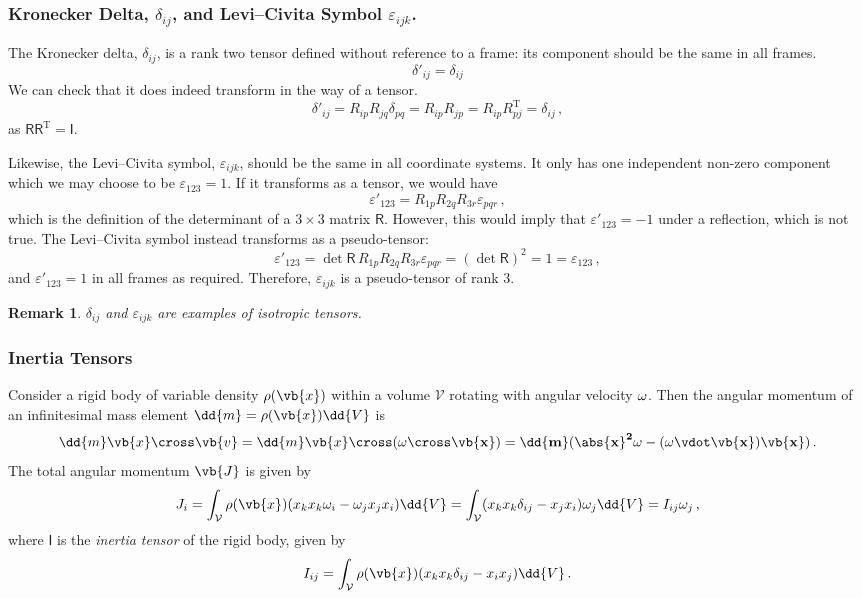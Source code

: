 \documentclass{article}
\theoremstyle{plain}\theoremheaderfont{\normalfont\itshape}\theorembodyfont{\rmfamily}\theoremseparator{.}\newtheorem*{rem}{Remark}\newtheorem*{ex}{Example}\newtheorem*{proof}{Proof}\newtheorem*{altp}{Alternative proof}
\theoremstyle{plain}\theoremheaderfont{\normalfont\bfseries}\theorembodyfont{\rmfamily}\theoremseparator{.}\newtheorem{thm}{Theorem}[section]\newtheorem{lem}[thm]{Lemma}\newtheorem{prop}[thm]{Proposition}\newtheorem*{cor}{Corollary}\newtheorem{defn}[thm]{Definition}\newtheorem{clm}[thm]{Claim}\newtheorem{clminproof}{Claim}
\theoremstyle{break}\theoremheaderfont{\normalfont\itshape}\theorembodyfont{\rmfamily}\theoremseparator{.\medskip}\newtheorem*{proofskip}{Proof}\newtheorem*{exs}{Examples}\newtheorem*{rems}{Remarks}
\theoremstyle{break}\theoremheaderfont{\normalfont\bfseries}\theorembodyfont{\rmfamily}\theoremseparator{.\medskip}\newtheorem{lemskip}[thm]{Lemma}\newtheorem{defnskip}[thm]{Definition}\newtheorem{propskip}[thm]{Proposition}\newtheorem{thmskip}[thm]{Theorem}
\numberwithin{equation}{section}
\newcommand{\tp}{^\mathrm{T}}
\begin{document}
	\subsubsection{Kronecker Delta, \(\delta_{ij}\), and Levi--Civita Symbol \(\varepsilon_{ijk}\).}
	The Kronecker delta, \(\delta_{ij}\), is a rank two tensor defined without reference to a frame: its component should be the same in all frames.
	\[\delta'_{ij}=\delta_{ij}\]
	We can check that it does indeed transform in the way of a tensor.
	\[\delta'_{ij}=R_{ip}R_{jq}\delta_{pq}=R_{ip}R_{jp}=R_{ip}R_{pj}\tp=\delta_{ij}\,,\]
	as \(\mathsf{RR}\tp=\mathsf{I}\).

	Likewise, the Levi--Civita symbol, \(\varepsilon_{ijk}\), should be the same in all coordinate systems. It only has one independent non-zero component which we may choose to be \(\varepsilon_{123}=1\). If it transforms as a tensor, we would have
	\[\varepsilon'_{123}=R_{1p}R_{2q}R_{3r}\varepsilon_{pqr}\,,\]
	which is the definition of the determinant of a \(3\times 3\) matrix \(\mathsf{R}\). However, this would imply that \(\varepsilon'_{123}=-1\) under a reflection, which is not true. The Levi--Civita symbol instead transforms as a pseudo-tensor:
	\[\varepsilon'_{123}=\det\mathsf{R}\,R_{1p}R_{2q}R_{3r}\varepsilon_{pqr}=(\det \mathsf{R})^2=1=\varepsilon_{123}\,,\]
	and \(\varepsilon'_{123}=1\) in all frames as required. Therefore, \(\varepsilon_{ijk}\) is a pseudo-tensor of rank 3.
	
	\begin{rem}
		\(\delta_{ij}\) and \(\varepsilon_{ijk}\) are examples of \textit{isotropic tensors}.
	\end{rem}
	\subsubsection{Inertia Tensors}
	Consider a rigid body of variable density \(\rho(\vb{x})\) within a volume \(\mathcal{V}\) rotating with angular velocity \(\bf{\omega}\). Then the angular momentum of an infinitesimal mass element \(\dd{m}=\rho(\vb{x})\dd{V}\) is
	\[\dd{m}\vb{x}\cross\vb{v}=\dd{m}\vb{x}\cross(\bf{\omega}\cross\vb{x})=\dd{m}(\abs{x}^2\bf{\omega}-(\bf{\omega}\vdot\vb{x})\vb{x})\,.\]
	The total angular momentum \(\vb{J}\) is given by
	\[J_i=\int_\mathcal{V}\rho(\vb{x})(x_kx_k\omega_i-\omega_jx_jx_i)\dd{V}=\int_\mathcal{V}(x_kx_k\delta_{ij}-x_jx_i)\omega_j\dd{V}=I_{ij}\omega_j\,,\]
	where \(\mathsf{I}\) is the \textit{inertia tensor} of the rigid body, given by
	\[I_{ij}=\int_\mathcal{V}\rho(\vb{x})(x_kx_k\delta_{ij}-x_ix_j)\dd{V}\,.\]
\end{document}
